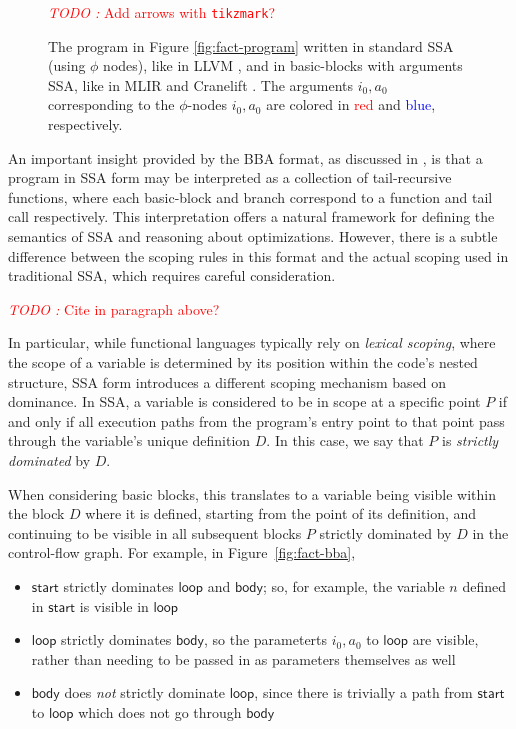 \documentclass[acmsmall,screen,review]{acmart}
\newcounter{todos}
\newcommand{\TODO}[1]{{
  \stepcounter{todos}
  \begin{center}\large{\textcolor{red}{\emph{TODO \arabic{todos}:} #1}}\end{center}
}}
\newcommand{\ms}[1]{\ensuremath{\mathsf{#1}}}
\begin{document}
\begin{figure}
  \TODO{Add arrows with \texttt{tikzmark}?}
  
  \caption{
    The program in Figure \ref{fig:fact-program} written in standard SSA (using $\phi$ nodes),
    like in LLVM \cite{llvm}, and in basic-blocks with arguments SSA, like in MLIR \cite{mlir} and
    Cranelift \cite{cranelift}. The arguments $i_0, a_0$ corresponding to the $\phi$-nodes $i_0,
    a_0$ are colored in \textcolor{red}{red} and \textcolor{blue}{blue}, respectively.
  }

  \Description{}
\end{figure}

An important insight provided by the BBA format, as discussed in \citet{appel-ssa}, is that a
program in SSA form may be interpreted as a collection of tail-recursive functions, where each
basic-block and branch correspond to a function and tail call respectively. This interpretation
offers a natural framework for defining the semantics of SSA and reasoning about optimizations.
However, there is a subtle difference between the scoping rules in this format and the actual
scoping used in traditional SSA, which requires careful consideration.

\TODO{Cite \citet{kelsey-95-cps} in paragraph above?}

In particular, while functional languages typically rely on \textit{lexical scoping}, where the
scope of a variable is determined by its position within the code's nested structure, SSA form
introduces a different scoping mechanism based on dominance. In SSA, a variable is considered to be
in scope at a specific point $P$ if and only if all execution paths from the program's entry point
to that point pass through the variable's unique definition $D$. In this case, we say that $P$ is
\textit{strictly dominated} by $D$.

When considering basic blocks, this translates to a variable being visible within the block $D$
where it is defined, starting from the point of its definition, and continuing to be visible in all
subsequent blocks $P$ strictly dominated by $D$ in the control-flow graph. For example, in
Figure~\ref{fig:fact-bba},
\begin{itemize}
  \item \ms{start} strictly dominates \ms{loop} and \ms{body}; so, for example, the variable $n$
  defined in \ms{start} is visible in \ms{loop}
  \item \ms{loop} strictly dominates \ms{body}, so the parameterts $i_0, a_0$ to \ms{loop} are
  visible, rather than needing to be passed in as parameters themselves as well
  \item \ms{body} does \textit{not} strictly dominate \ms{loop}, since there is trivially a path
  from \ms{start} to \ms{loop} which does not go through \ms{body}
\end{itemize}
\end{document}
